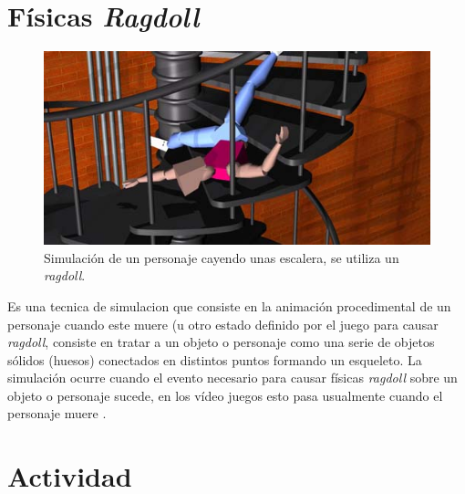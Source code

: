 \section{Físicas \emph{Ragdoll}}
\setlength\intextsep{0pt}
\begin{figure}
\includegraphics[width=\linewidth]{semana13/ragdoll.jpg}
\caption{Simulación de un personaje cayendo unas escalera, se utiliza un \emph{ragdoll}.}
\label{fig:ragdoll}
\end{figure}
Es una tecnica de simulacion que consiste en la animación procedimental de un personaje cuando este muere (u otro estado definido por el juego para causar \emph{ragdoll}, consiste en tratar a un objeto o personaje como una serie de objetos sólidos (huesos) conectados en distintos puntos formando un esqueleto. La simulación ocurre cuando el evento necesario para causar físicas \emph{ragdoll} sobre un objeto o personaje sucede, en los vídeo juegos esto pasa usualmente cuando el personaje muere \cite{eric_ragdoll}.

\section{Actividad}

